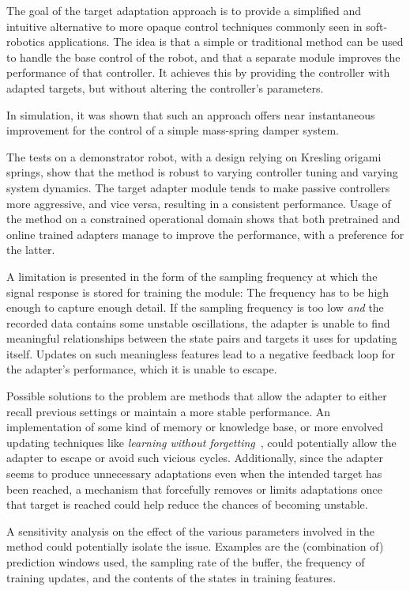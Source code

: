 The goal of the target adaptation approach is to provide a simplified and intuitive alternative to more opaque control techniques commonly seen in soft-robotics applications.
The idea is that a simple or traditional method can be used to handle the base control of the robot, and that a separate module improves the performance of that controller.
It achieves this by providing the controller with adapted targets, but without altering the controller's parameters.

In simulation, it was shown that such an approach offers near instantaneous improvement for the control of a simple mass-spring damper system.

The tests on a demonstrator robot, with a design relying on Kresling origami springs, show that the method is robust to varying controller tuning and varying system dynamics.
The target adapter module tends to make passive controllers more aggressive, and vice versa, resulting in a consistent performance.
Usage of the method on a constrained operational domain shows that both pretrained and online trained adapters manage to improve the performance, with a preference for the latter.

A limitation is presented in the form of the sampling frequency at which the signal response is stored for training the module: The frequency has to be high enough to capture enough detail.
If the sampling frequency is too low \emph{and} the recorded data contains some unstable oscillations, the adapter is unable to find meaningful relationships between the state pairs and targets it uses for updating itself.
Updates on such meaningless features lead to a negative feedback loop for the adapter's performance, which it is unable to escape.

Possible solutions to the problem are methods that allow the adapter to either recall previous settings or maintain a more stable performance.
An implementation of some kind of memory or knowledge base, or more envolved updating techniques like \emph{learning without forgetting}~\parencite{Li2016}, could potentially allow the adapter to escape or avoid such vicious cycles.
Additionally, since the adapter seems to produce unnecessary adaptations even when the intended target has been reached, a mechanism that forcefully removes or limits adaptations once that target is reached could help reduce the chances of becoming unstable.

A sensitivity analysis on the effect of the various parameters involved in the method could potentially isolate the issue.
Examples are the (combination of) prediction windows used, the sampling rate of the buffer, the frequency of training updates, and the contents of the states in training features.

